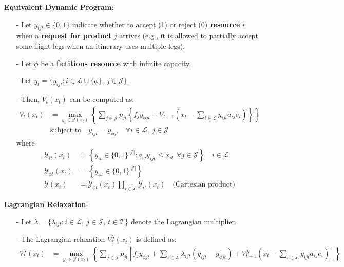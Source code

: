\documentclass[11pt]{article}
\begin{document}
\noindent
\textbf{Equivalent Dynamic Program}:
\begin{itemize}[itemsep=0pt,parsep=0pt]
\item[-] Let $y_{ijt}\in\{0,1\}$ indicate whether to accept (1) or reject (0) \textbf{resource} $i$ when a \textbf{request for product} $j$ arrives (e.g., it is allowed to partially accept some flight legs when an itinerary uses multiple legs).
\item[-] Let $\phi$ be a \textbf{fictitious resource} with infinite capacity. 
\item[-] Let $y_t = \{y_{ijt} : i \in \mathcal{L} \cup \{\phi\}, \ j \in \mathcal{J}\}$.
\item[-] Then, $V_t(x_t)$ can be computed as:
    \begin{align*}
        V_t(x_t) &= \max_{y_t \in \mathcal{Y}(x_t)}
            \left\{ \sum_{j\in \mathcal{J}} p_{jt} 
            \left\{ 
                f_j y_{\phi jt} + 
                V_{t+1} \left(x_t - \sum_{i\in \mathcal{L}}y_{ijt}a_{ij}e_i\right) 
            \right\} \right\}
        \tag{DP2} \\
        & \text{subject to} \quad y_{ijt} = y_{\phi jt} \quad \forall i \in \mathcal{L}, \ j \in \mathcal{J}
    \end{align*}
    where
    \begin{align*}
        \mathcal{Y}_{it}(x_t) &= \left\{ 
            y_{it} \in \{0,1\}^{|\mathcal{J}|} : 
            a_{ij} y_{ijt} \leq x_{it} \ \ 
            \forall j \in \mathcal{J} 
        \right\} \quad i \in \mathcal{L} \\
        \mathcal{Y}_{\phi t}(x_t) &= \left\{ 
            y_{\phi t} \in \{0,1\}^{|\mathcal{J}|} 
        \right\} \\
        \mathcal{Y}(x_t) &= \mathcal{Y}_{\phi t}(x_t) \prod_{i \in \mathcal{L}} \mathcal{Y}_{it}(x_t) \quad \text{(Cartesian product)}
    \end{align*}
\end{itemize}

\vspace{0.5cm}

\noindent
\textbf{Lagrangian Relaxation}:
\begin{itemize}[itemsep=0pt,parsep=0pt]
\item[-] Let $\lambda = \{\lambda_{ijt} : i \in \mathcal{L}, \ j \in \mathcal{J}, \ t \in \mathcal{T}\}$ denote the Lagrangian multiplier. 
\item[-] The Lagrangian relaxation $V^{\lambda}_t(x_t)$ is defined as:
    {\small
    \begin{align*}
        V^{\lambda}_t(x_t) &= \max_{y_t \in \mathcal{Y}(x_t)} 
            \left\{ \sum_{j\in \mathcal{J}} p_{jt} 
            \left[ 
                f_j y_{\phi jt} +
                \sum_{i \in \mathcal{L}} \lambda_{ijt} (y_{ijt} - y_{\phi jt}) + 
                V^{\lambda}_{t+1} \left(x_t - \sum_{i\in \mathcal{L}}y_{ijt}a_{ij}e_i\right) 
            \right] \right\}
            \tag{LR} 
    \end{align*}
    }%
\end{itemize}
\end{document}
